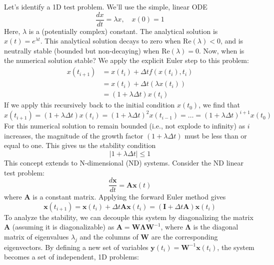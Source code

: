 Let's identify a 1D test problem. We'll use the simple, linear ODE
\begin{equation}
    \frac{dx}{dt} = \lambda x, \quad x(0) = 1
\end{equation}
Here, $\lambda$ is a (potentially complex) constant. The analytical solution is $x(t) = e^{\lambda t}$. This analytical solution decays to zero when $\text{Re}(\lambda) < 0$, and is neutrally stable (bounded but non-decaying) when $\text{Re}(\lambda) = 0$. Now, when is the numerical solution stable? We apply the explicit Euler step to this problem:
\begin{align*}
    x(t_{i+1}) &= x(t_i) + \Delta t f(x(t_i), t_i) \\
    &= x(t_i) + \Delta t (\lambda x(t_i)) \\
    &= (1 + \lambda \Delta t) x(t_i)
\end{align*}
If we apply this recursively back to the initial condition $x(t_0)$, we find that
\begin{equation}
    x(t_{i+1}) = (1 + \lambda \Delta t) x(t_i) = (1 + \lambda \Delta t)^2 x(t_{i-1}) = \dots = (1 + \lambda \Delta t)^{i+1} x(t_0)
\end{equation}
For this numerical solution to remain bounded (i.e., not explode to infinity) as $i$ increases, the magnitude of the growth factor $(1 + \lambda \Delta t)$ must be less than or equal to one. This gives us the stability condition
\begin{equation}
    |1 + \lambda \Delta t| \le 1
\end{equation}
This concept extends to N-dimensional (ND) systems. Consider the ND linear test problem:
\begin{equation}
    \frac{d\mathbf{x}}{dt} = \mathbf{A}\mathbf{x}(t)
\end{equation}
where $\mathbf{A}$ is a constant matrix. Applying the forward Euler method gives
\begin{equation}
    \mathbf{x}(t_{i+1}) = \mathbf{x}(t_i) + \Delta t \mathbf{A} \mathbf{x}(t_i) = (\mathbf{I} + \Delta t \mathbf{A}) \mathbf{x}(t_i)
\end{equation}
To analyze the stability, we can decouple this system by diagonalizing the matrix $\mathbf{A}$ (assuming it is diagonalizable) as $\mathbf{A} = \mathbf{W} \boldsymbol{\Lambda} \mathbf{W}^{-1}$, where $\boldsymbol{\Lambda}$ is the diagonal matrix of eigenvalues $\lambda_j$ and the columns of $\mathbf{W}$ are the corresponding eigenvectors. By defining a new set of variables $\mathbf{y}(t_i) = \mathbf{W}^{-1}\mathbf{x}(t_i)$, the system becomes a set of independent, 1D problems:
